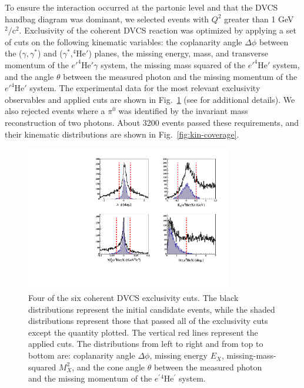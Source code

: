 \documentclass[twocolumn,nofootinbib,showpacs,prl,superscriptaddress,secnumarabic,amssymb,nobibnotes,aps,floatfix]{revtex4}
\begin{document}
To ensure the interaction occurred at the partonic level and that the DVCS handbag 
diagram was dominant, we selected events with $Q^{2}$ greater than 1 
GeV$^{2}/$c$^{2}$. Exclusivity of the coherent DVCS reaction was optimized by 
applying a set of cuts on the following kinematic variables: the coplanarity 
angle $\Delta\phi$ between the ($\gamma,\gamma^*$) 
and ($\gamma^*$,$^4$He$'$) planes, the missing energy, mass, and transverse
momentum of the $e'^4$He$'\gamma$ system, the missing mass squared of 
the $e'^4$He$'$ system, and the angle $\theta$
between the measured photon and the missing momentum of the $e'^4$He$'$ system.  
The experimental data for the most relevant exclusivity observables and applied
cuts are shown in Fig.~\ref{fig:kin-cuts} (see \cite{Hattawy:thesis} for 
additional details). We also 
rejected events where a $\pi^0$ was identified by the invariant mass reconstruction of 
two photons. About 3200 events passed these requirements, and their kinematic 
distributions are shown in Fig.~\ref{fig:kin-coverage}.

\begin{figure}[tb]
\includegraphics[width=9cm]{figs/coh_exc_cuts.pdf}
\caption{Four of the six coherent DVCS exclusivity cuts. The black 
distributions represent the initial candidate events, while the shaded 
distributions represent those that passed all of the exclusivity cuts except 
the quantity plotted. The vertical red lines represent the applied cuts.
The distributions from left to right and from top to bottom are: coplanarity 
angle $\Delta \phi$, missing energy $E_X$, missing-mass-squared $M_X^2$, and 
the cone angle $\theta$ between the measured photon and the missing momentum 
of the $e^\prime{^4}$He$^\prime$ system.}
\label{fig:kin-cuts}
\end{figure}
 
\end{document}

